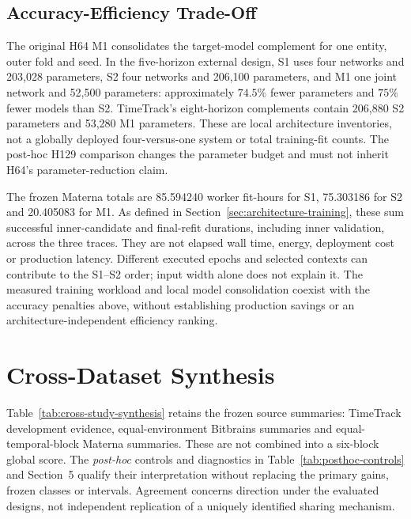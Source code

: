 \documentclass[a4paper,fleqn]{cas-dc}
\begin{document}
\subsection{Accuracy-Efficiency Trade-Off}
\label{sec:results-efficiency}

The original H64 M1 consolidates the target-model complement for one entity,
outer fold and seed. In the five-horizon external design, S1 uses four
networks and 203,028 parameters, S2 four networks and 206,100 parameters, and
M1 one joint network and 52,500 parameters: approximately $74.5\%$ fewer
parameters and $75\%$ fewer models than S2. TimeTrack's eight-horizon
complements contain 206,880 S2 parameters and 53,280 M1 parameters. These
are local architecture inventories, not a globally deployed four-versus-one
system or total training-fit counts. The post-hoc H129 comparison changes
the parameter budget and must not inherit H64's parameter-reduction claim.



The frozen Materna totals are 85.594240 worker fit-hours for S1, 75.303186 for
S2 and 20.405083 for M1. As defined in Section~\ref{sec:architecture-training},
these sum successful inner-candidate and final-refit durations, including
inner validation, across the three traces. They are not elapsed wall time,
energy, deployment cost or production latency. Different executed epochs and
selected contexts can contribute to the S1--S2 order; input width alone does
not explain it. The measured training workload and local model consolidation
coexist with the accuracy penalties above, without establishing production
savings or an architecture-independent efficiency ranking.

\section{Cross-Dataset Synthesis}
\label{sec:cross-dataset-synthesis}

Table~\ref{tab:cross-study-synthesis} retains the frozen source summaries:
TimeTrack development evidence, equal-environment Bitbrains summaries and
equal-temporal-block Materna summaries. These are not combined into a
six-block global score. The \emph{post-hoc} controls and diagnostics in
Table~\ref{tab:posthoc-controls} and Section~5 qualify their interpretation
without replacing the primary gains, frozen classes or intervals. Agreement
concerns direction under the evaluated designs, not independent replication
of a uniquely identified sharing mechanism.
\end{document}
